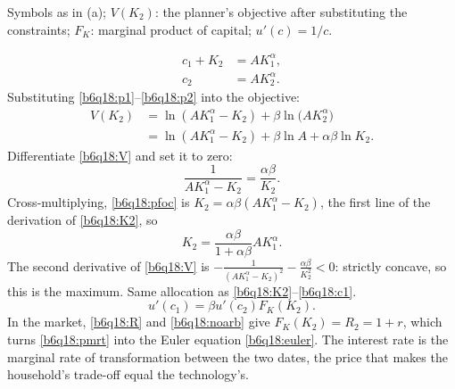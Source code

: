 \begin{sol}
\begin{notacao}
\item Symbols as in (a); $V(K_2)$: the planner's objective after substituting the constraints; $F_K$: marginal product of capital;
$u'(c)=1/c$.
\end{notacao}
\begin{align}
c_1+K_2&=AK_1^\alpha, \label{b6q18:p1}\\
c_2&=AK_2^\alpha. \label{b6q18:p2}
\end{align}
Substituting \eqref{b6q18:p1}--\eqref{b6q18:p2} into the objective:
\begin{align}
V(K_2)&=\ln(AK_1^\alpha-K_2)+\beta\ln\big(AK_2^\alpha\big)\nonumber\\
&=\ln(AK_1^\alpha-K_2)+\beta\ln A+\alpha\beta\ln K_2. \label{b6q18:V}
\end{align}
Differentiate \eqref{b6q18:V} and set it to zero:
\begin{equation}
\frac{1}{AK_1^\alpha-K_2}=\frac{\alpha\beta}{K_2}. \label{b6q18:pfoc}
\end{equation}
Cross-multiplying, \eqref{b6q18:pfoc} is $K_2=\alpha\beta(AK_1^\alpha-K_2)$, the first line of the derivation of \eqref{b6q18:K2}, so
\[
K_2=\frac{\alpha\beta}{1+\alpha\beta}AK_1^\alpha .
\]
The second derivative of \eqref{b6q18:V} is $-\frac1{(AK_1^\alpha-K_2)^2}-\frac{\alpha\beta}{K_2^2}<0$: strictly concave, so this is the maximum.
Same allocation as \eqref{b6q18:K2}--\eqref{b6q18:c1}.
\begin{equation}
u'(c_1)=\beta u'(c_2)F_K(K_2). \label{b6q18:pmrt}
\end{equation}
In the market, \eqref{b6q18:R} and \eqref{b6q18:noarb} give $F_K(K_2)=R_2=1+r$, which turns \eqref{b6q18:pmrt} into the Euler equation
\eqref{b6q18:euler}. The interest rate is the marginal rate of transformation between the two dates, the price that makes the
household's trade-off equal the technology's.
\end{sol}


